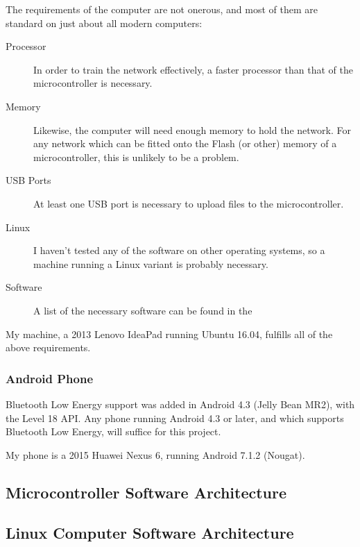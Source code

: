 \documentclass[a4paper]{article}
\begin{document}
The requirements of the computer are not onerous, and most of them are standard on just about all modern computers:

\begin{description}
\item[Processor] In order to train the network effectively, a faster processor than that of the microcontroller is necessary. 
\item[Memory] Likewise, the computer will need enough memory to hold the network. For any network which can be fitted onto the Flash (or other) memory of a microcontroller, this is unlikely to be a problem.
\item[USB Ports] At least one USB port is necessary to upload files to the microcontroller.
\item[Linux] I haven't tested any of the software on other operating systems, so a machine running a Linux variant is probably necessary.
\item[Software] A list of the necessary software can be found in the 
\end{description}

My machine, a 2013 Lenovo IdeaPad running Ubuntu 16.04, fulfills all of the above requirements.

\subsubsection{Android Phone}

Bluetooth Low Energy support was added in Android 4.3 (Jelly Bean MR2), with the Level 18 API.\cite{dsref5} Any phone running Android 4.3 or later, and which supports Bluetooth Low Energy, will suffice for this project.

My phone is a 2015 Huawei Nexus 6, running Android 7.1.2 (Nougat).

\subsection{Microcontroller Software Architecture}%


\subsection{Linux Computer Software Architecture}%

\end{document}
